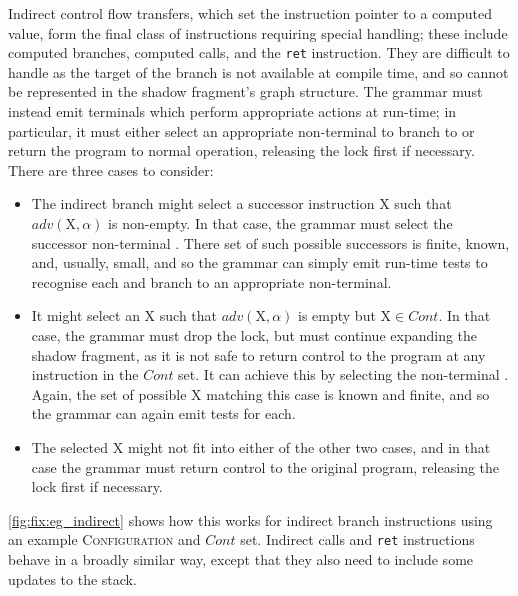 Indirect control flow transfers, which set the instruction pointer to
a computed value, form the final class of instructions requiring
special handling; these include computed branches, computed calls, and
the \texttt{ret} instruction.  They are difficult to handle as the
target of the branch is not available at compile time, and so cannot
be represented in the shadow fragment's graph structure.  The grammar
must instead emit terminals which perform appropriate actions at
run-time; in particular, it must either select an appropriate
non-terminal to branch to or return the program to normal operation,
releasing the lock first if necessary.  There are three cases to
consider:
\begin{itemize}
\item The indirect branch might select a successor instruction X such
  that $\mathit{adv}(\textrm{X}, \alpha)$ is non-empty.  In that case,
  the grammar must select the successor non-terminal .  There
  set of such possible successors is finite, known, and, usually,
  small, and so the grammar can simply emit run-time tests to
  recognise each and branch to an appropriate non-terminal.
\item It might select an X such that $\mathit{adv}(\textrm{X},
  \alpha)$ is empty but $\mathrm{X} \in \mathit{Cont}$.  In that case,
  the grammar must drop the lock, but must continue expanding the
  shadow fragment, as it is not safe to return control to the program
  at any instruction in the $\mathit{Cont}$ set.  It can achieve this
  by selecting the non-terminal .  Again, the set of possible X matching this case
  is known and finite, and so the grammar can again emit tests for
  each.
\item The selected X might not fit into either of the other two cases,
  and in that case the grammar must return control to the original
  program, releasing the lock first if necessary.
\end{itemize}
\autoref{fig:fix:eg_indirect} shows how this works for indirect branch
instructions using an example \textsc{Configuration} and
$\mathit{Cont}$ set.  Indirect calls and \texttt{ret} instructions
behave in a broadly similar way, except that they also need to include
some updates to the stack.


